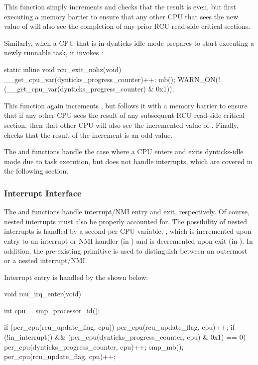 This function simply increments  and
checks that the result is even, but first executing a memory barrier
to ensure that any other CPU that sees the new value of
 will also see the completion
of any prior RCU read-side critical sections.

Similarly, when a CPU that is in dynticks-idle mode prepares to
start executing a newly runnable task, it invokes
:

\begin{VerbatimN}
static inline void rcu_exit_nohz(void)
{
	__get_cpu_var(dynticks_progress_counter)++;
	mb();
	WARN_ON(!(__get_cpu_var(dynticks_progress_counter) &
	          0x1));
}
\end{VerbatimN}

This function again increments ,
but follows it with a memory barrier to ensure that if any other CPU
sees the result of any subsequent RCU read-side critical section,
then that other CPU will also see the incremented value of
.
Finally,  checks that the result of the
increment is an odd value.

The  and 
functions handle the case where a CPU enters and exits dynticks-idle
mode due to task execution, but does not handle interrupts, which are
covered in the following section.

\subsubsection{Interrupt Interface}
\label{sec:formal:Interrupt Interface}

The  and 
functions handle interrupt/NMI entry and exit, respectively.
Of course, nested interrupts must also be properly accounted for.
The possibility of nested interrupts is handled by a second per-CPU
variable, , which is incremented upon
entry to an interrupt or NMI handler (in )
and is decremented upon exit (in ).
In addition, the pre-existing  primitive is
used to distinguish between an outermost or a nested interrupt/NMI\@.

Interrupt entry is handled by the 
shown below:

\begin{fcvlabel}
\begin{VerbatimN}[commandchars=\\\[\]]
void rcu_irq_enter(void)
{
	int cpu = smp_processor_id();	\lnlbl[fetch]

	if (per_cpu(rcu_update_flag, cpu))	\lnlbl[inc:b]
		per_cpu(rcu_update_flag, cpu)++; \lnlbl[inc:e]
	if (!in_interrupt() &&			\lnlbl[chk_lv:b]
	    (per_cpu(dynticks_progress_counter,
	             cpu) & 0x1) == 0) {	\lnlbl[chk_lv:e]
		per_cpu(dynticks_progress_counter, cpu)++; 
		smp_mb();			\lnlbl[mb]
		per_cpu(rcu_update_flag, cpu)++;
	}
}
\end{VerbatimN}
\end{fcvlabel}

